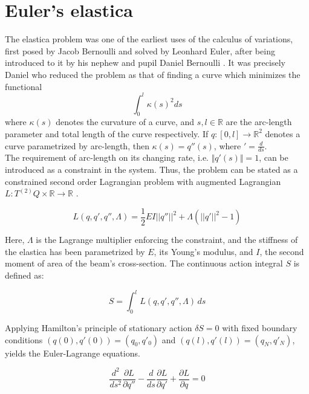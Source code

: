 
\section*{Euler's elastica}%
The elastica problem was one of the earliest uses of the calculus of variations, first posed by Jacob Bernoulli and solved by Leonhard Euler, after being introduced to it by his nephew and pupil Daniel Bernoulli \cite{matsutani2010}. It was precisely Daniel who reduced the problem as that of finding a curve which minimizes the functional
\begin{equation*}
    \int_0^l \kappa(s)^2 ds
\end{equation*}
where $\kappa(s)$ denotes the curvature of a curve, and $s, l \in \mathbb{R}$ are the arc-length parameter and total length of the curve respectively. If $q: [0, l] \to \mathbb{R}^2$ denotes a curve parametrized by arc-length, then $\kappa(s) = q''(s)$, where $' = \frac{d}{d s}$.\\

The requirement of arc-length on its changing rate, i.e. $\Vert q'(s) \Vert = 1$, can be introduced as a constraint in the system. Thus, the problem can be stated as a constrained second order Lagrangian problem with augmented Lagrangian $L: T^{(2)}Q \times \mathbb{R} \rightarrow \mathbb{R}$ \cite{singer2008}.

\begin{equation}\label{eq:L_static_elastica}
    L \left( q, q', q'',\Lambda\right) = \frac{1}{2} EI ||q''||^2 + \Lambda (||q'||^2-1) 
\end{equation}

Here, $\Lambda$ is the Lagrange multiplier enforcing the constraint, and the stiffness of the elastica has been parametrized by $E$, its Young's modulus, and $I$, the second moment of area of the beam's cross-section. The continuous action integral $S$ is defined as:

\begin{equation}
    S = \int_{0}^{l} L \left(q,q',q'',\Lambda \right) \,ds 
\end{equation}

Applying Hamilton’s principle of stationary action $\delta S =0$ with fixed boundary conditions $(q(0),q'(0)) = (q_0,q'_0)$ and $(q(l),q'(l)) = (q_N, q'_N)$, yields the Euler-Lagrange equations.

\begin{equation}\label{eq:second_order_ELeq}
    \frac{d^2}{d s^2}  \frac{\partial L}{\partial q''} - \frac{d}{d s}  \frac{\partial L}{\partial q'} + \frac{\partial L}{\partial q} = 0
\end{equation}

